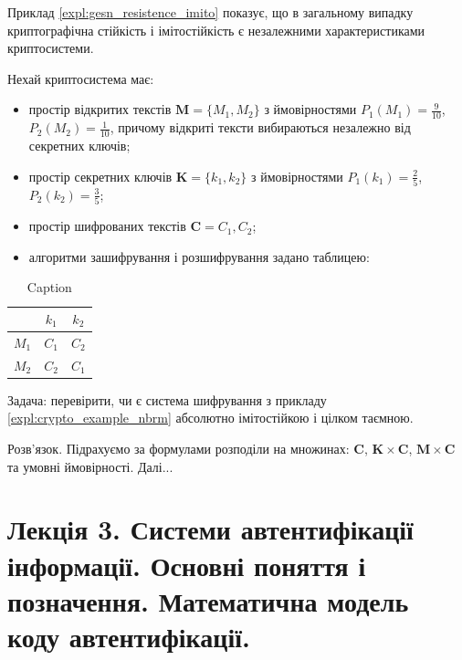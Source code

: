 Приклад \ref{expl:gesn_resistence_imito} показує, що в загальному випадку криптографічна стійкість і
імітостійкість є незалежними характеристиками криптосистеми.

\begin{example}\label{expl:crypto_example_nbrm}
    Нехай криптосистема має:
    \begin{itemize}
        \item простір відкритих текстів $\mathbf{M} = \{M_1, M_2\}$ з ймовірностями
        $P_1(M_1) = \frac{9}{10}$, $P_2(M_2) = \frac{1}{10}$, причому відкриті тексти вибираються
        незалежно від секретних ключів;
        \item простір секретних ключів $\mathbf{K} = \{k_1, k_2\}$ з ймовірностями
        $P_1(k_1) = \frac{2}{5}$, $P_2(k_2) = \frac{3}{5}$;
        \item простір шифрованих текстів $\mathbf{C} = {C_1, C_2}$;
        \item алгоритми зашифрування і розшифрування задано таблицею:
    \end{itemize}
\end{example}

\begin{table}[ht]
    \centering
    \begin{tabular}{|c|c|c|}
        \hline       & $k_1$ & $k_2$ \\
        \hline $M_1$ & $C_1$ & $C_2$ \\
        \hline$M_2$ & $C_2$ & $C_1$ \\
        \hline
    \end{tabular}
    \caption{Caption}
    \label{tab:cipher_de_cipher_exaplms}
\end{table}

\begin{problem}
    Задача: перевірити, чи є система шифрування з прикладу \ref{expl:crypto_example_nbrm} абсолютно
    імітостійкою і цілком таємною.
\end{problem}

\begin{solution}
    Розв’язок. Підрахуємо за формулами розподіли на множинах: $\mathbf{C}$, $\mathbf{K} \times \mathbf{C}$, $\mathbf{M} \times \mathbf{C}$ та умовні ймовірності. Далі...
\end{solution}

\section{Лекція 3. Системи автентифікації інформації. Основні поняття і позначення. Математична модель коду автентифікації.}



